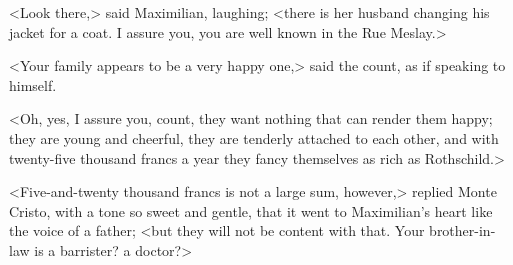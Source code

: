  <Look there,> said Maximilian, laughing; <there is her husband changing his jacket for a coat. I assure you, you are well known in the Rue Meslay.> 

 <Your family appears to be a very happy one,> said the count, as if speaking to himself. 

 <Oh, yes, I assure you, count, they want nothing that can render them happy; they are young and cheerful, they are tenderly attached to each other, and with twenty-five thousand francs a year they fancy themselves as rich as Rothschild.> 

 <Five-and-twenty thousand francs is not a large sum, however,> replied Monte Cristo, with a tone so sweet and gentle, that it went to Maximilian's heart like the voice of a father; <but they will not be content with that. Your brother-in-law is a barrister? a doctor?> 

